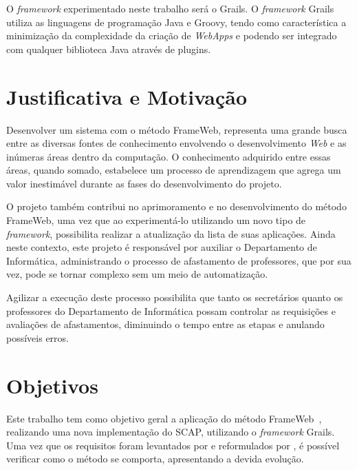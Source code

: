 O \textit{framework} experimentado neste trabalho será o Grails. O \textit{framework} Grails utiliza as linguagens de programação Java e Groovy, tendo como característica a minimização da complexidade da criação de \textit{WebApps} e podendo ser integrado com qualquer biblioteca Java através de plugins.



\section{Justificativa e Motivação}
\label{sec-intro-justificativa-motivacao}

Desenvolver um sistema com o método FrameWeb, representa uma grande busca entre as diversas fontes de conhecimento envolvendo o desenvolvimento \textit{Web} e as inúmeras áreas dentro da computação. O conhecimento adquirido entre essas áreas, quando somado, estabelece um processo de aprendizagem que agrega um valor inestimável durante as fases do desenvolvimento do projeto.

O projeto também contribui no aprimoramento e no desenvolvimento do método FrameWeb, uma vez que ao experimentá-lo utilizando um novo tipo de \textit{framework}, possibilita realizar a atualização da lista de suas aplicações. Ainda neste contexto, este projeto é responsável por auxiliar o Departamento de Informática, administrando o processo de afastamento de professores, que por sua vez, pode se tornar complexo sem um meio de automatização.

Agilizar a execução deste processo possibilita que tanto os secretários quanto os professores do Departamento de Informática possam controlar as requisições e avaliações de afastamentos, diminuindo o tempo entre as etapas e anulando possíveis erros.               



\section{Objetivos}
\label{sec-intro-objetivos}

Este trabalho tem como objetivo geral a aplicação do método FrameWeb~\cite{souza:masterthesis07,souza-celebratingfalbo20}, realizando uma nova implementação do SCAP, utilizando o \textit{framework} Grails. Uma vez que os requisitos foram levantados por  e reformulados por , é possível verificar como o método se comporta, apresentando a devida evolução.

